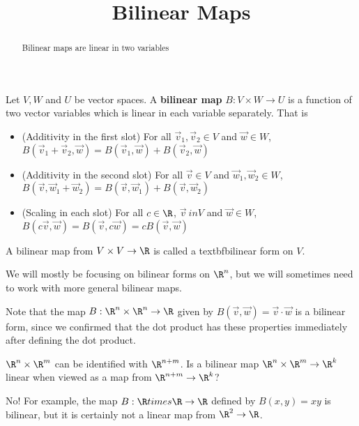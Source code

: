 \documentclass{ximera}
\title{Bilinear Maps}
\begin{document}
\begin{abstract}
	Bilinear maps are linear in two variables
\end{abstract}	

	\begin{definition}
		Let $V,W$ and $U$ be vector spaces.  A \textbf{bilinear map} $B: V \times W \to U$ is a function of two vector variables which is linear in each variable separately. 
		That is
			\begin{itemize}
				\item (Additivity in the first slot) For all $\vec{v}_1,\vec{v}_2 \in V$ and 
				$\vec{w} \in W$, $B(\vec{v}_1+\vec{v}_2,\vec{w}) = B(\vec{v}_1,\vec{w})+B(\vec{v}_2,\vec{w})$
				
				\item (Additivity in the second slot) For all $\vec{v} \in V$ and 
				$\vec{w}_1,\vec{w}_2 \in W$, $B(\vec{v},\vec{w}_1+\vec{w}_2) = B(\vec{v},\vec{w}_1)+B(\vec{v},\vec{w}_2)$
				
				\item (Scaling in each slot) For all $c \in \R$, $\vec{v} \ in V$ and 
				$\vec{w} \in W$, $B(c\vec{v},\vec{w}) = B(\vec{v},c\vec{w}) = cB(\vec{v},\vec{w})$
			\end{itemize}
	\end{definition}
	
	A bilinear map from $V \times V \to \R$ is called a textbf{bilinear form} on $V$.
	
	We will mostly be focusing on bilinear forms on $\R^n$, but we will sometimes need to work with more general bilinear maps.
	
	Note that the map $B:\R^n \times \R^n \to \R$ given by $B(\vec{v},\vec{w}) = \vec{v} \cdot \vec{w}$ is a bilinear form, since we confirmed that
	the dot product has these properties immediately after defining the dot product.
	
		$\R^n \times \R^m$ can be identified with $\R^{n+m}$.  Is a bilinear map $\R^n \times \R^m \to \R^k$ linear when viewed as a map from $\R^{n+m} \to \R^k$?
	\begin{free-response}
		No!  For example, the map $B:\R times \R \to \R$ defined by $B(x,y)=xy$ is bilinear, but it is certainly not a linear map from $\R^2 \to \R$.
	\end{free-response}
	
\end{document}
